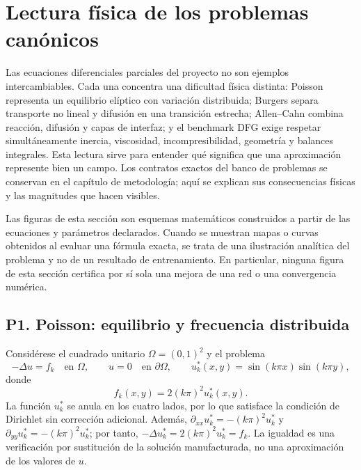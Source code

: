 
\section{Lectura física de los problemas canónicos}
\label{sec:lectura-fisica-pdes}

Las ecuaciones diferenciales parciales del proyecto no son ejemplos
intercambiables. Cada una concentra una dificultad física distinta: Poisson
representa un equilibrio elíptico con variación distribuida; Burgers separa
transporte no lineal y difusión en una transición estrecha; Allen--Cahn
combina reacción, difusión y capas de interfaz; y el benchmark DFG exige
respetar simultáneamente inercia, viscosidad, incompresibilidad, geometría y
balances integrales. Esta lectura sirve para entender qué significa que una
aproximación represente bien un campo. Los contratos exactos del banco de
problemas se conservan en el capítulo de metodología; aquí se explican sus
consecuencias físicas y las magnitudes que hacen visibles.

Las figuras de esta sección son esquemas matemáticos construidos a partir de
las ecuaciones y parámetros declarados. Cuando se muestran mapas o curvas
obtenidos al evaluar una fórmula exacta, se trata de una ilustración analítica
del problema y no de un resultado de entrenamiento. En particular, ninguna
figura de esta sección certifica por sí sola una mejora de una red o una
convergencia numérica.

\subsection{P1. Poisson: equilibrio y frecuencia distribuida}

Considérese el cuadrado unitario $\Omega=(0,1)^2$ y el problema
\begin{equation}
-\Delta u=f_k \quad \text{en }\Omega,
\qquad u=0 \quad \text{en }\partial\Omega,
\qquad
u_k^*(x,y)=\sin(k\pi x)\sin(k\pi y),
\label{eq:expansion-p1-poisson}
\end{equation}
donde
\begin{equation}
f_k(x,y)=2(k\pi)^2u_k^*(x,y).
\label{eq:expansion-p1-source}
\end{equation}
La función $u_k^*$ se anula en los cuatro lados, por lo que satisface la
condición de Dirichlet sin corrección adicional. Además,
$\partial_{xx}u_k^*=-(k\pi)^2u_k^*$ y
$\partial_{yy}u_k^*=-(k\pi)^2u_k^*$; por tanto,
$-\Delta u_k^*=2(k\pi)^2u_k^*=f_k$. La igualdad es una verificación por
sustitución de la solución manufacturada, no una aproximación de los valores
de $u$.

